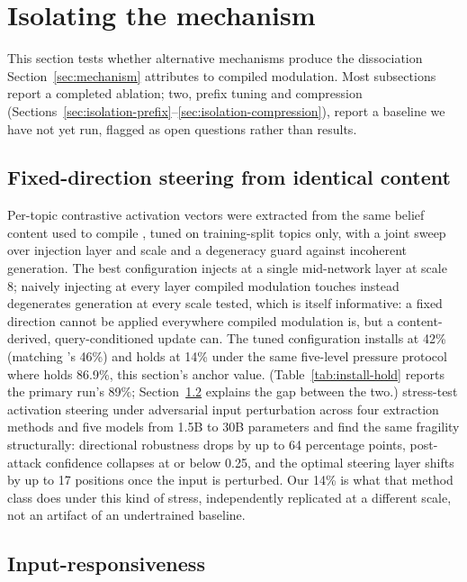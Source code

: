 \iflongversion
\section{Isolating the mechanism}
\label{sec:isolation}

This section tests whether alternative mechanisms produce the dissociation
Section~\ref{sec:mechanism} attributes to compiled modulation. Most subsections
report a completed ablation; two, prefix tuning and compression
(Sections~\ref{sec:isolation-prefix}--\ref{sec:isolation-compression}), report a
baseline we have not yet run, flagged as open questions rather than results.

\subsection{Fixed-direction steering from identical content}
\label{sec:isolation-steering}

Per-topic contrastive activation vectors were extracted from the same belief content
used to compile \condF{}, tuned on training-split topics only, with a joint
sweep over injection layer and scale and a degeneracy guard against incoherent
generation. The best configuration injects at a single mid-network layer at scale 8;
naively injecting at every layer compiled modulation touches instead degenerates
generation at every scale tested, which is itself informative: a fixed direction cannot
be applied everywhere compiled modulation is, but a content-derived, query-conditioned
update can. The tuned configuration installs at 42\% (matching \condC{}'s 46\%) and holds
at 14\% under the same five-level pressure protocol where \condF{} holds
86.9\%,
this section's anchor value. (Table~\ref{tab:install-hold} reports the primary run's
89\%; Section~\ref{sec:isolation-frozen} explains the gap between the two.)
\citet{le2026steeringrobustness} stress-test activation
steering under adversarial input perturbation across four extraction methods and five
models from 1.5B to 30B parameters and find the same fragility structurally: directional
robustness drops by up to 64 percentage points, post-attack confidence collapses at or
below 0.25, and the optimal steering layer shifts by up to 17 positions once the input
is perturbed. Our 14\% is what that method class does under this kind of stress,
independently replicated at a different scale, not an artifact of an undertrained
baseline.

\subsection{Input-responsiveness}
\label{sec:isolation-frozen}


